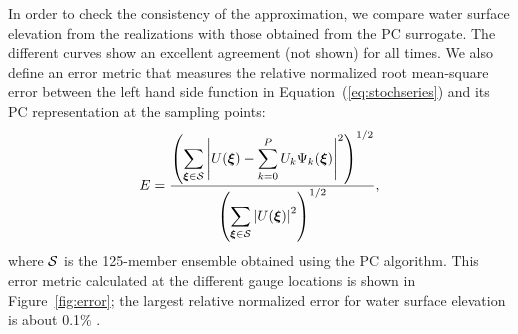 In order to check the consistency of the approximation, we compare
 water surface elevation from the realizations 
with those obtained from the PC surrogate. The different curves
show an excellent agreement (not shown) for all times. We also define
an error metric that measures the relative normalized root mean-square error between the left hand side function 
in Equation~(\ref{eq:stochseries})
and its PC representation at the sampling points:
\begin{equation} 
   E = \frac{\displaystyle
         \left(\sum_{\xxi \in \NISP} \left|U(\xxi) - \sum_{k = 0}^{P}
U_k\Psi_k(\xxi)\right|^2
         \right)^{1/2}}
        {\displaystyle
          \left(\sum_{\xxi \in \NISP} \left|U(\xxi)\right|^2\right)^{1/2} 
          },
\label{eq:error}
\end{equation}
where $\mathcal{S}$ is the 125-member ensemble obtained using the PC algorithm. 
This error metric calculated at the different gauge locations is shown in Figure~\ref{fig:error};
the largest relative normalized error for 
water surface elevation is about 0.1\% . 
